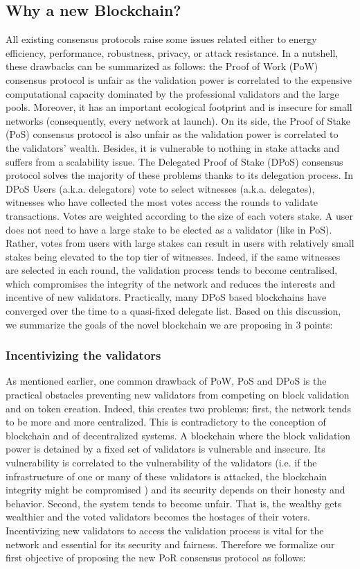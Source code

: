 \subsection{Why a new Blockchain?}
All existing consensus protocols raise some issues related either to energy efficiency, performance, robustness, privacy, or attack resistance. In a nutshell, these drawbacks can be summarized as follows: the Proof of Work (PoW) consensus protocol is unfair as the validation power is correlated to the expensive computational capacity dominated by the professional validators and the large pools. Moreover, it has an important ecological footprint and is insecure for small networks (consequently, every network at launch). On its side, the Proof of Stake (PoS) consensus protocol is also unfair as the validation power is correlated to the validators' wealth. Besides, it is vulnerable to nothing in stake attacks and suffers from a scalability issue. The Delegated Proof of Stake (DPoS) consensus protocol solves the majority of these problems thanks to its delegation process. In DPoS Users (a.k.a. delegators) vote to select witnesses (a.k.a. delegates), witnesses who have collected the most votes access the rounds to validate transactions. Votes are weighted according to the size of each voters stake. A user does not need to have a large stake to be elected as a validator (like in PoS). Rather, votes from users with large stakes can result in users with relatively small stakes being elevated to the top tier of witnesses. Indeed, if the same witnesses are selected in each round, the validation process tends to become centralised, which compromises the integrity of the network and reduces the interests and incentive of new validators. Practically, many DPoS based blockchains have converged over the time to a quasi-fixed delegate list.
Based on this discussion, we summarize the goals of the novel blockchain we are proposing in 3 points:

\subsubsection{Incentivizing the validators} As mentioned earlier, one common drawback of PoW, PoS and DPoS is the practical obstacles preventing new validators from competing on block validation and on token creation. Indeed, this creates two problems: first, the network tends to be more and more centralized. This is contradictory to the conception of blockchain and of decentralized systems. A blockchain where the block validation power is detained by a fixed set of validators is vulnerable and insecure. Its vulnerability is correlated to the vulnerability of the validators (i.e. if the infrastructure of one or many of these validators is attacked, the blockchain integrity might be compromised ) and its security depends on their honesty and behavior. Second, the system tends to become unfair. That is, the wealthy gets wealthier and the voted validators becomes the hostages of their voters. Incentivizing new validators to access the validation process is vital for the network and essential for its security and fairness. Therefore we formalize our first objective of proposing the new PoR consensus protocol as follows:\\

